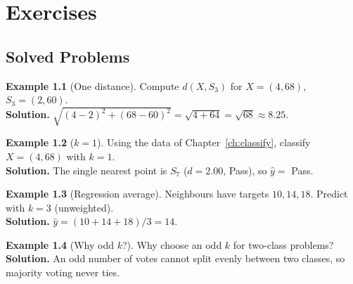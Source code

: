 \documentclass[11pt,a4paper]{report}
\theoremstyle{definition}
\newtheorem{example}{Example}[chapter]
\theoremstyle{remark}
\begin{document}
	\chapter{Exercises}
	
	\section{Solved Problems}
	\begin{example}[One distance]
		Compute $d(X,S_3)$ for $X=(4,68)$, $S_3=(2,60)$.\\
		\textbf{Solution.} $\sqrt{(4-2)^2+(68-60)^2}=\sqrt{4+64}=\sqrt{68}\approx8.25.$
	\end{example}
	\begin{example}[$k=1$]
		Using the data of Chapter~\ref{ch:classify}, classify $X=(4,68)$ with $k=1$.\\
		\textbf{Solution.} The single nearest point is $S_7$ ($d=2.00$, Pass), so
		$\hat y=$ Pass.
	\end{example}
	\begin{example}[Regression average]
		Neighbours have targets $10,14,18$. Predict with $k=3$ (unweighted).\\
		\textbf{Solution.} $\hat y=(10+14+18)/3=14.$
	\end{example}
	\begin{example}[Why odd $k$?]
		Why choose an odd $k$ for two-class problems?\\
		\textbf{Solution.} An odd number of votes cannot split evenly between two
		classes, so majority voting never ties.
	\end{example}
	
\end{document}
